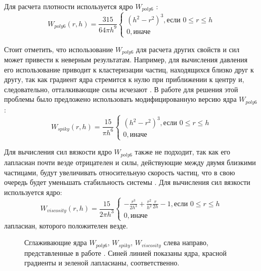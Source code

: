 Для расчета плотности используется ядро \(W_{poly6}\) \cite {Müller2003}:
\[
    W_{poly6}(r,h)= \frac{315}{64\pi h^{9}}
    \begin{cases}
        (h^{2}-r^{2})^{3}, \text{если } 0 \leqslant r \leqslant  h \\
        0, \text{иначе}
    \end{cases}
\]

Стоит отметить, что использование \(W_{poly6}\) для расчета других свойств и сил может привести к неверным результатам. Например, для вычисления давления его использование приводит к кластеризации частиц, находящихся близко друг к другу, так как градиент ядра стремится к нулю при  приближении к центру и, следовательно, отталкивающие силы исчезают \cite {Müller2003}. В работе \cite {Desbrun1996} для решения этой проблемы было предложено использовать модифицированную версию ядра \(W_{poly6}\):
\[
    W_{spiky}(r,h)= \frac{15}{\pi h^{6}}
    \begin{cases}
        (h^{2}-r^{2})^{3}, \text{если } 0 \leqslant r \leqslant  h \\
        0, \text{иначе}
    \end{cases}
\]

Для вычисления сил вязкости ядро \(W_{poly6}\) также не подходит, так как его лапласиан почти везде отрицателен и силы, действующие между двумя близкими частицами, будут увеличивать относительную скорость частиц, что в свою очередь будет уменьшать стабильность системы \cite {Müller2003}.  Для вычисления сил вязкости используется ядро:
\[
    W_{viscosity}(r,h)= \frac{15}{2\pi h^{3}}
    \begin{cases}
        -\frac{r^{3}}{2h^{3}}+\frac{r^{2}}{h^{2}} \frac{r}{2h} - 1, \text{если } 0 \leqslant r \leqslant  h \\
        0, \text{иначе}
    \end{cases}
\]
лапласиан, которого положителен везде.

\begin{figure}[ht]
    \caption{Сглаживающие ядра \(W_{poly6}\), \(W_{spiky}\), \(W_{viscosity}\) слева направо, представленные в работе \cite {Müller2003}. Синей линией показаны ядра, красной градиенты и зеленой лапласианы, соответственно.}\label{fig:ker_kind}
\end{figure}

